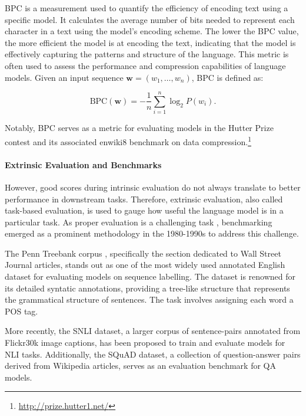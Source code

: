 \ac{BPC} is a measurement used to quantify the efficiency of encoding text using a specific model. It calculates the average number of bits needed to represent each character in a text using the model's encoding scheme. The lower the \ac{BPC} value, the more efficient the model is at encoding the text, indicating that the model is effectively capturing the patterns and structure of the language. This metric is often used to assess the performance and compression capabilities of language models. Given an input sequence $\bm{w} = (w_1, \ldots, w_n)$, \ac{BPC} is defined as:

\begin{equation}
    \text{BPC}(\bm{w}) = - \dfrac{1}{n} \sum_{i=1}^n \log_2 P(w_i).
\end{equation}

\noindent Notably, \ac{BPC} serves as a metric for evaluating models in the Hutter Prize contest and its associated enwiki8 benchmark on data compression.\footnote{\url{http://prize.hutter1.net/}}

\paragraph{Extrinsic Evaluation and Benchmarks} However, good scores during intrinsic evaluation do not always translate to better performance in downstream tasks. Therefore, extrinsic evaluation, also called task-based evaluation, is used to gauge how useful the language model is in a particular task. As proper evaluation is a challenging task \citep{jones2005some}, benchmarking emerged as a prominent methodology in the 1980-1990s to address this challenge. 

The Penn Treebank corpus \citep{marcus1993building}, specifically the section dedicated to Wall Street Journal articles, stands out as one of the most widely used annotated English dataset for evaluating models on sequence labelling. The dataset is renowned for its detailed syntatic annotations, providing a tree-like structure that represents the grammatical structure of sentences. The task involves assigning each word a \ac{POS} tag. 

More recently, the \ac{SNLI} dataset, a larger corpus of sentence-pairs annotated from Flickr30k image captions, has been proposed to train and evaluate models for \ac{NLI} tasks. Additionally, the \ac{SQuAD} \citep{rajpurkar2016squad} dataset, a collection of question-answer pairs derived from Wikipedia articles, serves as an evaluation benchmark for \ac{QA} models. 

